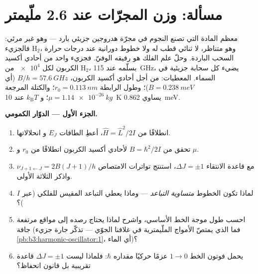 \section{مسألة: وزن المجرّات عند 2.6 ملّيمتر}

\begin{problem}\label{pb:b3:quantum-angular-momentum:1}
معظم المادة التي تصنع النجوم في مجرّة هدروجين جزيئي بارد ---
وهو غير مرئي: فالجزيء H$_2$، وهو متناظر، لا ثنائي قطب له ولا
خطوط دورانية عند درجات حرارة السحب الباردة. وحلّ علم الفلك هو
رفيقه الوفيّ. فجزيء واحد من أحادي أكسيد الكربون لكل $\num{e4}$ من H$_2$، بسلّمه
عند \qty{115}{GHz}، يضيء كل سحابة جزيئية في
السماء. المعطيات: من أجل أحادي أكسيد الكربون، $B/h = \qty{57.6}{GHz}$ (أي $B =
\qty{0.238}{meV}$)؛ وطول الرابطة $r_0 = \qty{0.113}{nm}$؛ والكتلة
المرجعة $\mu = \qty{1.14e-26}{kg}$؛ و $k_{\text{B}}T$ عند \qty{10}{K} يساوي
\qty{0.862}{meV}.

\medskip\noindent\textbf{الجزء الأول --- الدوّار الكمومي.}
\begin{enumerate}
  \item انطلاقًا من $\hat H = \hat L^2/2I$، أعطِ الطاقات $E_J$ و
        انحلالاتها.
  \item تحقق من $B = \hbar^2/2I$ لأحادي أكسيد الكربون انطلاقًا من $r_0$ و $\mu$.
  \item مع قاعدة الانتقاء $\Delta J = \pm1$، استنتج
        تواترات الامتصاص $\nu_{J+1\leftarrow J} = 2B(J+1)/h$
        واذكر الثلاثة الأولى.
  \item لماذا تكون الخطوط \emph{متساوية التباعد} --- وماذا يعطي
        التباعد المقيس للفلكي (عبر $I$)؟
  \item احسب طول موجة الخط الأساسي، واشرح
        لماذا يحتاج رصده إلى مواقع مرتفعة جافة (فما الذي يمتصّ
        الأمواج الملّيمترية في غلافنا الجوّي --- تذكّر
        جارة جزيء \cref{pb:b3:harmonic-oscillator:1}،
        أي الماء)؟
  \item يحمل فوتون الخط $1 \to 0$ عزمًا حركيًا مقداره $\hbar$:
        فلماذا ليست $\Delta J = \pm1$ قاعدة تقريبية
        بل قانون انحفاظ؟
\end{enumerate}


\end{problem}
